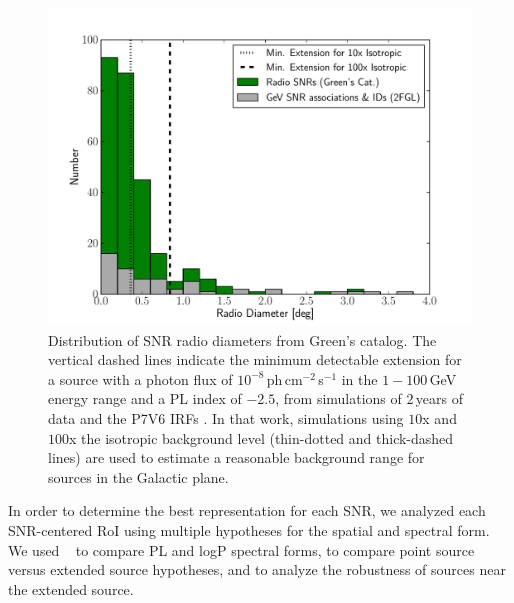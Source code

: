 \begin{figure}[h!]
	\centering
	\includegraphics[width=1.0\columnwidth]{figures/size_hist_p.pdf} 
	\caption[Distribution of SNR radio diameters from Green's catalog]{Distribution of SNR radio diameters from Green's catalog. The vertical dashed lines indicate the minimum detectable extension for a source with a photon flux of $10^{-8}$\,ph\,cm$^{-2}$\,s$^{-1}$ in the $1-100$\,GeV energy range and a PL index of $-2.5$, from simulations of $2$\,years of data and the P7V6 IRFs \citep{Lande12}. In that work, simulations using $10$x and $100$x the isotropic background level (thin-dotted and thick-dashed lines) are used to estimate a reasonable background range for sources in the Galactic plane.}
	\label{fig:size_hist_p}
\end{figure}

In order to determine the best representation for each SNR, we analyzed each SNR-centered RoI using multiple hypotheses for the spatial and spectral form. We used \ptlike{}~\citep{Kerr10} to compare PL and logP spectral forms, to compare point source versus extended source hypotheses, and to analyze the robustness of sources near the extended source.

